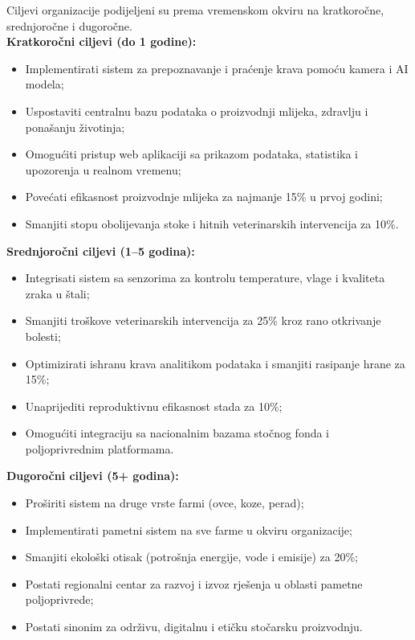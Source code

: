 \documentclass{article}
\begin{document}
Ciljevi organizacije podijeljeni su prema vremenskom okviru na kratkoročne, srednjoročne i dugoročne. \\

\textbf{Kratkoročni ciljevi (do 1 godine):}
\begin{itemize}
    \item Implementirati sistem za prepoznavanje i praćenje krava pomoću kamera i AI modela;
    \item Uspostaviti centralnu bazu podataka o proizvodnji mlijeka, zdravlju i ponašanju životinja;
    \item Omogućiti pristup web aplikaciji sa prikazom podataka, statistika i upozorenja u realnom vremenu;
    \item Povećati efikasnost proizvodnje mlijeka za najmanje 15\% u prvoj godini;
    \item Smanjiti stopu obolijevanja stoke i hitnih veterinarskih intervencija za 10\%.
\end{itemize}

\textbf{Srednjoročni ciljevi (1–5 godina):}
\begin{itemize}
    \item Integrisati sistem sa senzorima za kontrolu temperature, vlage i kvaliteta zraka u štali;
    \item Smanjiti troškove veterinarskih intervencija za 25\% kroz rano otkrivanje bolesti;
    \item Optimizirati ishranu krava analitikom podataka i smanjiti rasipanje hrane za 15\%;
    \item Unaprijediti reproduktivnu efikasnost stada za 10\%;
    \item Omogućiti integraciju sa nacionalnim bazama stočnog fonda i poljoprivrednim platformama.
\end{itemize}

\textbf{Dugoročni ciljevi (5+ godina):}
\begin{itemize}
    \item Proširiti sistem na druge vrste farmi (ovce, koze, perad);
    \item Implementirati pametni sistem na sve farme u okviru organizacije;
    \item Smanjiti ekološki otisak (potrošnja energije, vode i emisije) za 20\%;
    \item Postati regionalni centar za razvoj i izvoz rješenja u oblasti pametne poljoprivrede;
    \item Postati sinonim za održivu, digitalnu i etičku stočarsku proizvodnju.
\end{itemize}
\end{document}
